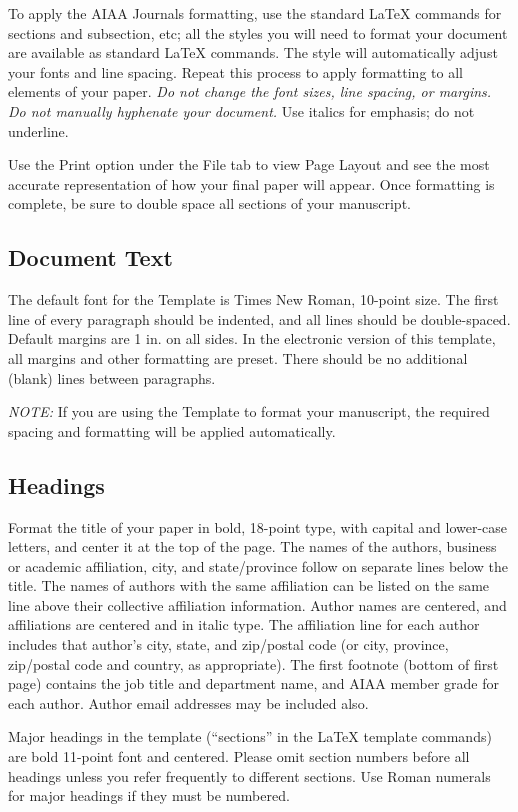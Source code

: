 To apply the AIAA Journals formatting, use the standard \LaTeX{} commands for sections and subsection, etc; all the styles you will need to format your document are available as standard \LaTeX{} commands. The style will automatically adjust your fonts and line spacing. Repeat this process to apply formatting to all elements of your paper. \emph{Do not change the font sizes, line spacing, or margins. Do not manually hyphenate your document.} Use italics for emphasis; do not underline. 

Use the Print option under the File tab to view Page Layout and see the most accurate representation of how your final paper will appear. Once formatting is complete, be sure to double space all sections of your manuscript.


\subsection{Document Text}
The default font for the Template is Times New Roman, 10-point size. The first line of every paragraph should be indented, and all lines should be double-spaced. Default margins are 1 in. on all sides. In the electronic version of this template, all margins and other formatting are preset. There should be no additional (blank) lines between paragraphs.

\emph{NOTE:} If you are using the Template to format your manuscript, the required spacing and formatting will be applied automatically.


\subsection{Headings}
Format the title of your paper in bold, 18-point type, with capital and lower-case letters, and center it at the top of the page. The names of the authors, business or academic affiliation, city, and state/province follow on separate lines below the title. The names of authors with the same affiliation can be listed on the same line above their collective affiliation information. Author names are centered, and affiliations are centered and in italic type. The affiliation line for each author includes that author’s city, state, and zip/postal code (or city, province, zip/postal code and country, as appropriate). The first footnote (bottom of first page) contains the job title and department name, and AIAA member grade for each author. Author email addresses may be included also.

Major headings in the template (``sections'' in the \LaTeX{} template commands) are bold 11-point font and centered. Please omit section numbers before all headings unless you refer frequently to different sections. Use Roman numerals for major headings if they must be numbered.

